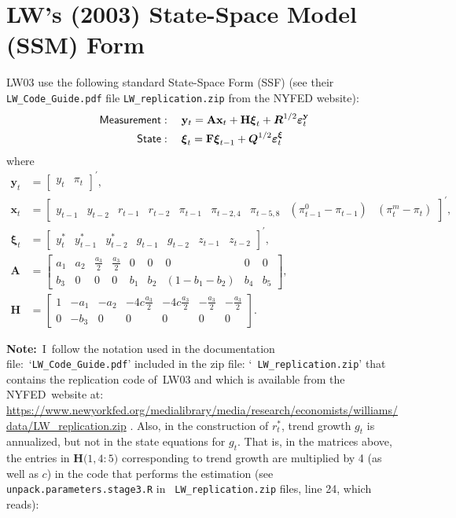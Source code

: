 \documentclass[a4paper,12pt]{article}
\begin{document}
\section{LW's (2003) State-Space Model (SSM) Form}

LW03 use the following standard State-Space Form (SSF) (see their \texttt{%
LW\_Code\_Guide.pdf} file \texttt{LW\_replication.zip} from the NYFED
website):%
\begin{align*}
\mathsf{Measurement}& :\quad \mathbf{y}_{t}=\mathbf{Ax}_{t}+\mathbf{H}%
\boldsymbol{\xi }_{t}+\boldsymbol{R}^{1/2}\boldsymbol{\varepsilon }_{t}^{%
\mathbf{y}} \\
\mathsf{State}& :\quad \boldsymbol{\xi }_{t}=\mathbf{F}\boldsymbol{\xi }%
_{t-1}+\boldsymbol{Q}^{1/2}\boldsymbol{\varepsilon }_{t}^{\boldsymbol{\xi }}
\end{align*}%
where%
\begin{align*}
\mathbf{y}_{t}& =%
\begin{bmatrix}
y_{t} & \pi _{t}%
\end{bmatrix}%
^{\prime }, \\
\mathbf{x}_{t}& =%
\begin{bmatrix}
y_{t-1} & y_{t-2} & r_{t-1} & r_{t-2} & \pi _{t-1} & \pi _{t-2,4} & \pi
_{t-5,8} & \left( \pi _{t-1}^{0}-\pi _{t-1}\right) & \left( \pi _{t}^{m}-\pi
_{t}\right)%
\end{bmatrix}%
^{\prime }, \\
\boldsymbol{\xi }_{t}& =%
\begin{bmatrix}
y_{t}^{\ast } & y_{t-1}^{\ast } & y_{t-2}^{\ast } & g_{t-1} & g_{t-2} & 
z_{t-1} & z_{t-2}%
\end{bmatrix}%
^{\prime }, \\
\mathbf{A}& =%
\begin{bmatrix}
a_{1} & a_{2} & \frac{a_{3}}{2} & \frac{a_{3}}{2} & 0 & 0 & 0 & 0 & 0 \\ 
b_{3} & 0 & 0 & 0 & b_{1} & b_{2} & \left( 1-b_{1}-b_{2}\right) & b_{4} & 
b_{5}%
\end{bmatrix}%
, \\
\mathbf{H}& =%
\begin{bmatrix}
1 & -a_{1} & -a_{2} & -4c\frac{a_{3}}{2} & -4c\frac{a_{3}}{2} & -\frac{a_{3}%
}{2} & -\frac{a_{3}}{2} \\ 
0 & -b_{3} & 0 & 0 & 0 & 0 & 0%
\end{bmatrix}%
.
\end{align*}

\noindent \textbf{Note:}\ I\ follow the notation used in the documentation
file:\ `\texttt{LW\_Code\_Guide.pdf}' included in the zip file: `\texttt{%
LW\_replication.zip}' that contains the replication code of\ LW03 and which
is available from the NYFED\ website at: %
\url{https://www.newyorkfed.org/medialibrary/media/research/economists/williams/data/LW\_replication.zip}%
. Also, in the construction of $r_{t}^{\ast }$, trend growth $g_{t}$ is
annualized, but not in the state equations for $g_{t}$. That is, in the
matrices above, the entries in $\mathbf{H(}1,4:5\mathbf{)}$ corresponding to
trend growth are multiplied by 4 (as well as $c$) in the code that performs
the estimation (see \texttt{unpack.parameters.stage3.R} in \texttt{%
LW\_replication.zip} files, line 24, which reads):\ 
\end{document}
